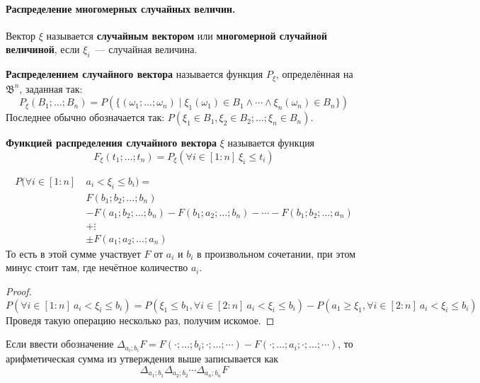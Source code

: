 \documentclass{article}
\newcommand{\B}{{\mathfrak B}}
\begin{document}
    \paragraph{Распределение многомерных случайных величин.}
    \begin{definition}
        Вектор $\xi$ называется \textbf{случайным вектором} или \textbf{многомерной случайной величиной}, если $\xi_i$~--- случайная величина.
    \end{definition}
    \begin{definition}
        \textbf{Распределением случайного вектора} называется функция $P_\xi$, определённая на $\B^n$, заданная так:
        $$
        P_\xi(B_1;\ldots;B_n)=P(\{(\omega_1;\ldots;\omega_n)\mid\xi_1(\omega_1)\in B_1\land\cdots\land \xi_n(\omega_n)\in B_n\})
        $$
        Последнее обычно обозначается так: $P(\xi_1\in B_1,\xi_2\in B_2;\ldots;\xi_n\in B_n)$.
    \end{definition}
    \begin{definition}
        \textbf{Функцией распределения случайного вектора} $\xi$ называется функция
        $$
        F_\xi(t_1;\ldots;t_n)=P_\xi(\forall i\in[1:n]~\xi_i\leqslant t_i)
        $$
    \end{definition}
    \begin{claim}
        \[\begin{split}
            P(\forall i\in[1:n]~&a_i<\xi_i\leqslant b_i)=\\
            &F(b_1;b_2;\ldots;b_n)\\
            &-F(a_1;b_2;\ldots;b_n)-F(b_1;a_2;\ldots;b_n)-\cdots-F(b_1;b_2;\ldots;a_n)\\
            &+\vdots\\
            &\pm F(a_1;a_2;\ldots;a_n)
        \end{split}\]
        То есть в этой сумме участвует $F$ от $a_i$ и $b_i$ в произвольном сочетании, при этом минус стоит там, где нечётное количество $a_i$.
    \end{claim}
    \begin{proof}
        $$
            P(\forall i\in[1:n]~a_i<\xi_i\leqslant b_i)=P(\xi_1\leqslant b_1,\forall i\in[2:n]~a_i<\xi_i\leqslant b_i)-P(a_1\geqslant\xi_1,\forall i\in[2:n]~a_i<\xi_i\leqslant b_i)
        $$
        Проведя такую операцию несколько раз, получим искомое.
    \end{proof}
    \begin{remark}
        Если ввести обозначение $\Delta_{a_i;b_i}F=F(\cdot;\ldots;b_i;\cdot;\ldots;\cdots)-F(\cdot;\ldots;a_i;\cdot;\ldots;\cdots)$, то арифметическая сумма из утверждения выше записывается как
        $$
        \Delta_{a_1;b_1}\Delta_{a_2;b_2}\cdots\Delta_{a_n;b_n}F
        $$
    \end{remark}
\end{document}
